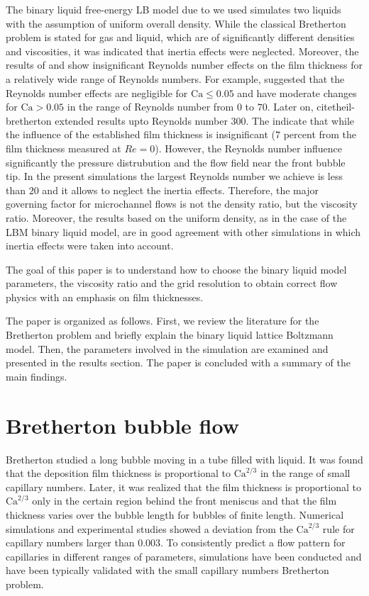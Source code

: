 \documentclass[preprint,12pt]{elsarticle}
\newcommand{\Ca}{\mathrm{Ca}}
\begin{document}
The binary liquid free-energy LB model due to \citet{swift} we used
simulates two liquids with the assumption of uniform overall
density. While the classical Bretherton problem is stated for gas and liquid, which are of
significantly
different densities and viscosities, it was indicated \cite{bretherton} that inertia effects were
neglected. Moreover, the results of \citet{giavedoni-numerical} and \citet{heil-bretherton} show
{\color{red} insignificant} Reynolds number effects on the film thickness for a relatively wide
range of Reynolds
numbers. 
{\color{red} For example, \citet{giavedoni-numerical} suggested that the Reynolds number effects
are negligible for $\Ca\leq0.05$ and have moderate changes for $\Ca>0.05$ in the range of Reynolds
number from $0$ to $70$. Later on, citet{heil-bretherton} extended results upto Reynolds number
$300$. The indicate that while the influence of the established film thickness is insignificant
($7$ percent from the film thickness measured at $Re=0$). However, the Reynolds number influence
significantly the pressure distrubution and the flow field near the front bubble tip. In the present
simulations the largest Reynolds number we achieve is less than $20$ and it allows to neglect the
inertia effects.} 
Therefore, the major governing factor for microchannel flows is not the density ratio, but the
viscosity ratio. Moreover, the results based on the uniform density, as in the case of the LBM
binary liquid model, are in good agreement with other simulations
\cite{giavedoni-numerical,heil-bretherton} in which inertia effects were taken into account.

The goal of this paper is to understand how to choose the
binary liquid model parameters, the viscosity ratio and the grid
resolution to obtain correct flow physics with an emphasis on film thicknesses.

The paper is organized as follows.  First, we review the literature
for the Bretherton problem and briefly
explain the binary liquid lattice Boltzmann model. Then, the parameters involved in the
simulation are examined and presented in the results section. The paper is
concluded with a summary of the main findings.

\section{Bretherton bubble flow}
Bretherton \cite{bretherton} studied a long bubble
moving in a tube filled with liquid. It was found that the deposition film thickness
is proportional to $\Ca^{2/3}$ in the range of small capillary numbers. Later,
it was realized \cite{wong-films,wong-pressure} that the film thickness
is proportional to $\Ca^{2/3}$ only in the certain region behind the front meniscus and
that the film thickness
varies over the bubble length for bubbles of finite length. Numerical
simulations \cite{giavedoni-numerical} and experimental studies
\cite{kreutzer-pressure-drop} showed a deviation from the $\Ca^{2/3}$ rule for capillary numbers
larger than $0.003$.
To consistently  predict a flow pattern for capillaries in
different ranges of parameters, simulations have been conducted and have been typically validated with the
small capillary numbers Bretherton problem.
\end{document}
